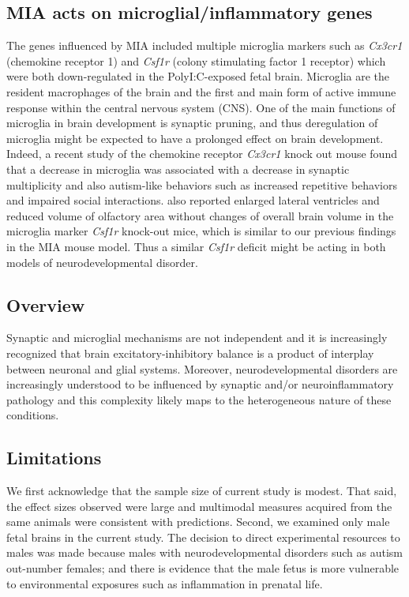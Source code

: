 \subsection{MIA acts on microglial/inflammatory genes}
The genes influenced by MIA included multiple microglia markers such as \textit{Cx3cr1} (chemokine receptor 1) and \textit{Csf1r} (colony stimulating factor 1 receptor) which were both down-regulated in the PolyI:C-exposed fetal brain. 
Microglia are the resident macrophages of the brain and the first and main form of active immune response within the central nervous system (CNS).
One of the main functions of microglia in brain development is synaptic pruning\cite{Paolicelli2011}, and thus deregulation of microglia might be expected to have a prolonged effect on brain development. 
Indeed, a recent study of the chemokine receptor \textit{Cx3cr1} knock out mouse found that a decrease in microglia was associated with a decrease in synaptic multiplicity and also autism-like behaviors such as increased repetitive behaviors and impaired social interactions\cite{Rogers2011}. 
\citet{Erblich2011} also reported enlarged lateral ventricles and reduced volume of olfactory area without changes of overall brain volume in the microglia marker \textit{Csf1r} knock-out mice, which is similar to our previous findings in the MIA mouse model\cite{Li2009c}. 
Thus a similar \textit{Csf1r} deficit might be acting in both models of neurodevelopmental disorder.
	
\subsection{Overview}
Synaptic and microglial mechanisms are not independent and it is increasingly recognized that brain excitatory-inhibitory balance is a product of interplay between neuronal and glial systems\cite{Zhan2014}. 
Moreover, neurodevelopmental disorders are increasingly understood to be influenced by synaptic and/or neuroinflammatory pathology and this complexity likely maps to the heterogeneous nature of these conditions\cite{Garay2010}.

\subsection{Limitations}
We first acknowledge that the sample size of current study is modest. 
That said, the effect sizes observed were large and multimodal measures acquired from the same animals were consistent with predictions. 
Second, we examined only male fetal brains in the current study. 
The decision to direct experimental resources to males was made because males with neurodevelopmental disorders such as autism out-number females; and there is evidence that the male fetus is more vulnerable to environmental exposures such as inflammation in prenatal life\cite{Bergeron2013}\cite{Lein2007}. 


